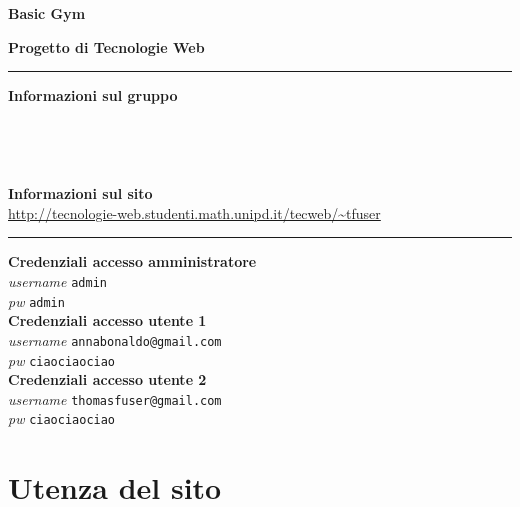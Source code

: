 \documentclass[12pt,a4paper]{article}
\title{\titoloDocumento}
\author{Anna Bonaldo}
\newcommand{\titoloDocumento}{Basic Gym}
\begin{document}
\begin{center}
	\[  \]
	\[  \]
	\[  \]

	\vspace{1cm}
	\begin{Huge}
		\textbf{{\titoloDocumento}}\\
		\vspace{0.5cm}
	\end{Huge}
	\begin{Large}
		\textbf{Progetto di Tecnologie Web}\\
		
	\end{Large}
	\vspace{1cm}
\end{center}
 \hrule


	\begin{center}
		
		\textbf{	Informazioni sul gruppo}
		\\
		\LBmat{} \\
		\TFmat{}\\
		\ABmat{}\\
		\ECmat{}\\
		\vspace{0.5cm}
		\textbf{Informazioni sul sito }\\
		\url{http://tecnologie-web.studenti.math.unipd.it/tecweb/~tfuser}
	\end{center}
	\vspace{0.5cm}
		\hrule	
	\begin{center}
		\textbf{Credenziali accesso amministratore}\\
		\textit{username} \texttt{admin}\\
		\textit{pw} \texttt{admin}\\
		\vspace{0.5cm}
		\textbf{Credenziali accesso utente 1}\\
		\textit{username} \texttt{annabonaldo@gmail.com}\\
		\textit{pw} \texttt{ciaociaociao}\\
		\vspace{0.5cm}
		\textbf{Credenziali accesso utente 2}\\
		\textit{username} \texttt{thomasfuser@gmail.com}\\
		\textit{pw} \texttt{ciaociaociao}\\
	\end{center}


	\newpage
	\tableofcontents
	
	\newpage
\section{Utenza del sito}
\end{document}

